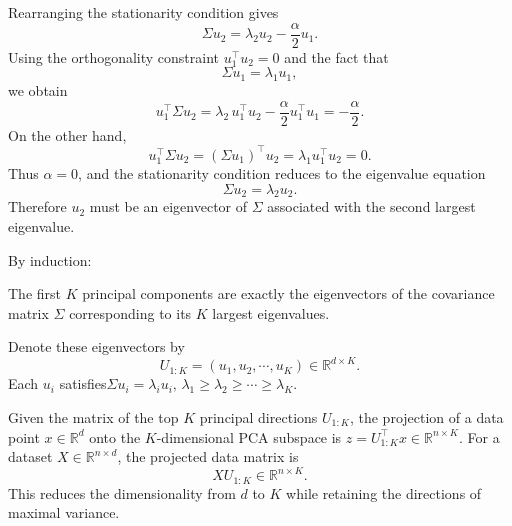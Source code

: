 \documentclass[../main]{subfiles}
\begin{document}
Rearranging the stationarity condition gives
\begin{equation}
    \Sigma u_2 = \lambda_2 u_2 - \frac{\alpha}{2} u_1.
\end{equation}
Using the orthogonality constraint $u_1^\top u_2 = 0$ and the fact that
\begin{equation}
    \Sigma u_1 = \lambda_1 u_1,
\end{equation}
we obtain
\begin{equation}
    u_1^\top \Sigma u_2 = \lambda_2\, u_1^\top u_2 - \frac{\alpha}{2} u_1^\top u_1
    = -\frac{\alpha}{2}.
\end{equation}
On the other hand,
\begin{equation}
    u_1^\top \Sigma u_2 = (\Sigma u_1)^\top u_2 = \lambda_1 u_1^\top u_2 = 0.
\end{equation}
Thus $\alpha = 0$, and the stationarity condition reduces to the eigenvalue equation
\begin{equation}
    \Sigma u_2 = \lambda_2 u_2.
\end{equation}
Therefore $u_2$ must be an eigenvector of $\Sigma$ associated with the second largest eigenvalue.

By induction:
\begin{theorem}
    The first $K$ principal components are exactly the eigenvectors of the covariance matrix $\Sigma$ corresponding to its $K$ largest eigenvalues.  
\end{theorem}
Denote these eigenvectors by
\begin{equation}
    U_{1:K}
    = 
(
        u_1,u_2 ,\cdots , u_K
)
    \in \mathbb{R}^{d \times K}.
\end{equation}
Each $u_i$ satisfies$
    \Sigma u_i = \lambda_i u_i,
    \,
    \lambda_1 \ge \lambda_2 \ge \cdots \ge \lambda_K.$

    Given the matrix of the top $K$ principal directions $U_{1:K}$, the projection of a data point $x \in \mathbb{R}^d$ onto the $K$-dimensional PCA subspace is $
        z = U_{1:K}^{\top} x 
        \in \mathbb{R}^{n\times K}.
$
    For a dataset $X \in \mathbb{R}^{n \times d}$, the projected data matrix is
    \begin{equation}
        X U_{1:K}
        \in \mathbb{R}^{n \times K}.
    \end{equation}
    This reduces the dimensionality from $d$ to $K$ while retaining the directions of maximal variance.
\end{document}
